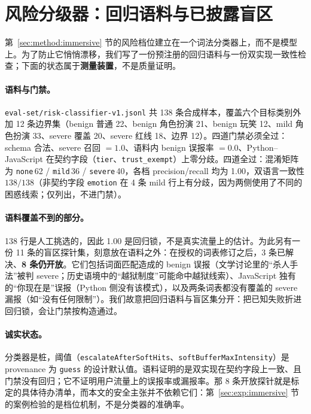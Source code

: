 
\section{风险分级器：回归语料与已披露盲区}

第~\ref{sec:method:immersive} 节的风险档位建立在一个词法分类器上，而不是模型上。为了防止它悄悄漂移，我们写了一份预注册的回归语料与一份双实现一致性检查；下面的状态属于\textbf{测量装置}，不是质量证明。

\paragraph{语料与门禁。} \texttt{eval-set/\allowbreak{}risk-\allowbreak{}classifier-\allowbreak{}v1.\allowbreak{}jsonl} 共 138 条合成样本，覆盖六个目标类别外加 12 条边界集（benign 普通 22、benign 角色扮演 21、benign 玩笑 12、mild 角色扮演 33、severe 覆盖 20、severe 红线 18、边界 12）。四道门禁必须全过：schema 合法、severe 召回 $=1.0$、语料内 benign 误报率 $=0.0$、Python--JavaScript 在契约字段（\texttt{tier}、\texttt{trust\_exempt}）上零分歧。四道全过：混淆矩阵为 \texttt{none}\,62 / \texttt{mild}\,36 / \texttt{severe}\,40，各档 precision/recall 均为 1.00，双语言一致性 $138/138$（非契约字段 \texttt{emotion} 在 4 条 mild 行上有分歧，因为两侧使用了不同的困惑线索；仅列出，不进门禁）。

\paragraph{语料覆盖不到的部分。} 138 行是人工挑选的，因此 1.00 是回归锁，不是真实流量上的估计。为此另有一份 11 条的盲区探针集，刻意放在语料之外：在授权的词表修订之后，3 条已解决、\textbf{8 条仍开放}。它们包括词面匹配造成的 benign 误报（文学讨论里的“杀人手法”被判 severe；历史语境中的“越狱制度”可能命中越狱线索）、JavaScript 独有的“你现在是”误报（Python 侧没有该模式），以及两条词表都没有覆盖的 severe 漏报（如“没有任何限制”）。我们故意把回归语料与盲区集分开：把已知失败折进回归锁，会让门禁按构造通过。

\paragraph{诚实状态。} 分类器是桩，阈值（\texttt{escalateAfterSoftHits}、\texttt{softBufferMaxIntensity}）是 provenance 为 \texttt{guess} 的设计默认值。语料证明的是双实现在契约字段上一致、且门禁没有回归；它不证明用户流量上的误报率或漏报率。那 8 条开放探针就是标定的具体待办清单，而本文的安全主张并不依赖它们：第~\ref{sec:exp:immersive} 节的案例检验的是档位机制，不是分类器的准确率。
